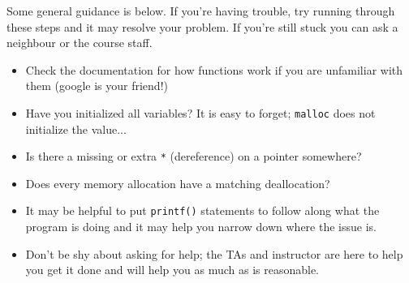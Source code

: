 Some general guidance is below. If you're having trouble, try running through these steps and it may resolve your problem. If you're still stuck you can ask a neighbour or the course staff.
\begin{itemize}
	\item Check the documentation for how functions work if you are unfamiliar with them (google is your friend!)
	\item Have you initialized all variables? It is easy to forget; \texttt{malloc} does not initialize the value...
	\item Is there a missing or extra \texttt{*} (dereference) on a pointer somewhere?
	\item Does every memory allocation have a matching deallocation?
	\item It may be helpful to put \texttt{printf()} statements to follow along what the program is doing and it may help you narrow down where the issue is.
	\item Don't be shy about asking for help; the TAs and instructor are here to help you get it done and will help you as much as is reasonable.
\end{itemize}




